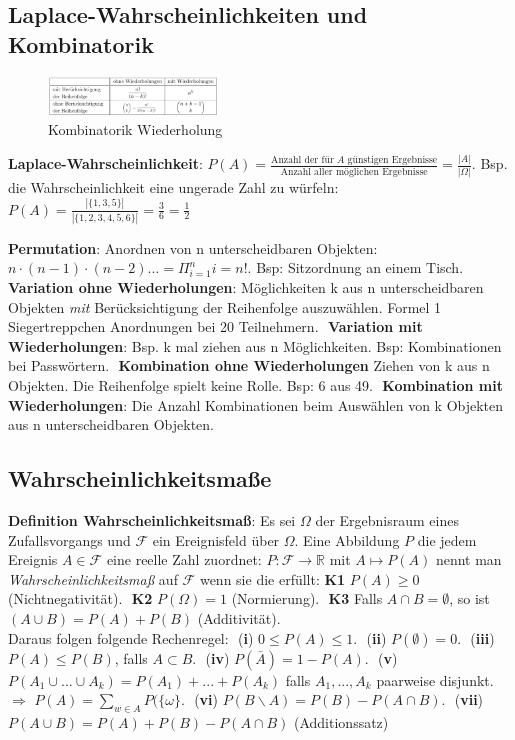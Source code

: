 \subsection{Laplace-Wahrscheinlichkeiten und Kombinatorik}
\begin{figure}
    \vspace{-6mm}
    \centering
    \includegraphics[width=0.4\textwidth]{images/wiederholung_kombinatorik.png}
    \caption{Kombinatorik Wiederholung}
    \vspace{-6mm}
    \label{fig:}
\end{figure}
\textbf{Laplace-Wahrscheinlichkeit}: $P(A) = \frac{\text{Anzahl der für $A$ günstigen Ergebnisse}}{\text{Anzahl aller möglichen Ergebnisse}} = \frac{|A|}{|\Omega|}$. Bsp. die Wahrscheinlichkeit eine ungerade Zahl zu würfeln: $P(A) = \frac{|\{1,3,5\}|}{|\{1,2,3,4,5,6\}|} = \frac{3}{6} = \frac{1}{2}$

\textbf{Permutation}: Anordnen von n unterscheidbaren Objekten: $n \cdot (n-1) \cdot (n-2) ... = \Pi_{i=1}^n i = n!$. Bsp: Sitzordnung an einem Tisch.\,\,\,\,\textbf{Variation ohne Wiederholungen}: Möglichkeiten k aus n unterscheidbaren Objekten \emph{mit} Berücksichtigung der Reihenfolge auszuwählen. Formel 1 Siegertreppchen Anordnungen bei 20 Teilnehmern.\,\,\,\,\textbf{Variation mit Wiederholungen}: Bsp. k mal ziehen aus n Möglichkeiten. Bsp: Kombinationen bei Passwörtern.\,\,\,\,\textbf{Kombination ohne Wiederholungen} Ziehen von k aus n Objekten. Die Reihenfolge spielt keine Rolle. Bsp:  6 aus 49.\,\,\,\,\textbf{Kombination mit Wiederholungen}: Die Anzahl Kombinationen beim Auswählen von k Objekten aus n unterscheidbaren Objekten.
\subsection{Wahrscheinlichkeitsmaße}
\textbf{Definition Wahrscheinlichkeitsmaß}: Es sei $\Omega$ der Ergebnisraum eines Zufallsvorgangs und $\mathcal{F}$ ein Ereignisfeld über $\Omega$. Eine Abbildung $P$ die jedem Ereignis $A \in \mathcal{F}$ eine reelle Zahl zuordnet: $P: \mathcal{F} \rightarrow \mathds{R}$ mit $A \mapsto P(A)$ nennt man \emph{Wahrscheinlichkeitsmaß} auf $\mathcal{F}$ wenn sie die  erfüllt: \textbf{K1} $P(A) \ge 0$ (Nichtnegativität).\,\,\,\,\textbf{K2} $P(\Omega) = 1$ (Normierung).\,\,\,\,\textbf{K3} Falls $A \cap B = \emptyset$, so ist $ (A \cup B) = P(A) + P(B)$ (Additivität).\\
Daraus folgen folgende Rechenregel:\,\,\,\,(\textbf{i}) $0 \le P(A) \le 1$.\,\,\,\,(\textbf{ii}) $P(\emptyset) = 0$.\,\,\,\,(\textbf{iii}) $P(A) \le P(B)$, falls $A \subset B$.\,\,\,\,(\textbf{iv}) $P(\bar{A}) = 1 - P(A)$.\,\,\,\,(\textbf{v}) $P(A_1\cup ... \cup A_k) = P(A_1) + ... + P(A_k)$ falls $A_1, ..., A_k$ paarweise disjunkt. $\Rightarrow$ $P(A) = \sum_{w \in A}P(\{\omega\}.$\,\,\,\,(\textbf{vi}) $P(B \backslash A) = P(B) - P(A \cap B)$.\,\,\,\,(\textbf{vii}) $P(A\cup B) = P(A) + P(B) - P(A \cap B)$ (Additionssatz)
